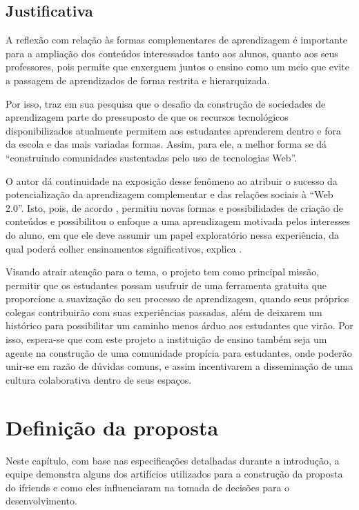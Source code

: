 \section{Justificativa}
A reflexão com relação às formas complementares de aprendizagem é importante para a ampliação dos conteúdos interessados tanto aos alunos, quanto aos seus professores, pois permite que enxerguem juntos o ensino como um meio que evite a passagem de aprendizados de forma restrita e hierarquizada.

Por isso,  traz em sua pesquisa que o desafio da construção de sociedades de aprendizagem parte do pressuposto de que os recursos tecnológicos disponibilizados atualmente permitem aos estudantes aprenderem dentro e fora da escola e das mais variadas formas. Assim, para ele, a melhor forma se dá ``construindo comunidades sustentadas pelo uso de tecnologias Web''.

O autor dá continuidade na exposição desse fenômeno ao atribuir o sucesso da potencialização da aprendizagem complementar e das relações sociais à ``Web 2.0''. Isto, pois, de acordo , permitiu novas formas e possibilidades de criação de conteúdos e possibilitou o enfoque a uma aprendizagem motivada pelos interesses do aluno, em que ele deve assumir um papel exploratório nessa experiência, da qual poderá colher ensinamentos significativos, explica .

Visando atrair atenção para o tema, o projeto tem como principal missão, permitir que os estudantes possam usufruir de uma ferramenta gratuita que proporcione a suavização do seu processo de aprendizagem, quando seus próprios colegas contribuirão com suas experiências passadas, além de deixarem um histórico para possibilitar um caminho menos árduo aos estudantes que virão. Por isso, espera-se que com este projeto a instituição de ensino também seja um agente na construção de uma comunidade propícia para estudantes, onde poderão unir-se em razão de dúvidas comuns, e assim incentivarem a disseminação de uma cultura colaborativa dentro de seus espaços.

\chapter{Definição da proposta}
Neste capítulo, com base nas especificações detalhadas durante a introdução, a equipe demonstra alguns dos artifícios utilizados para a construção da proposta do \gls{ifriends} e como eles influenciaram na tomada de decisões para o desenvolvimento.

